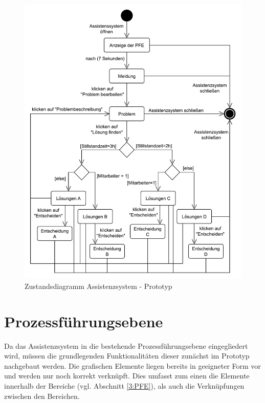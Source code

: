 \begin{figure}[tbp]
\centering
\includegraphics[scale=0.65]{DA_files/UML/Prototyp/Zustandsdiagramm-Assistenzsystem.pdf}
\caption{Zustandsdiagramm Assistenzsystem - Prototyp}
\label{pic:Zustandsdiagramm-Assistenzsystem}
\end{figure}

\section{Prozessführungsebene}
Da das Assistenzsystem in die bestehende Prozessführungsebene eingegliedert wird, müssen die grundlegenden Funktionalitäten dieser zunächst im Prototyp nachgebaut werden. Die grafischen Elemente liegen bereits in geeigneter Form vor und werden nur noch korrekt verknüpft. Dies umfasst zum einen die Elemente innerhalb der Bereiche (vgl. Abschnitt \ref{3:PFE}), als auch die Verknüpfungen zwischen den Bereichen.


